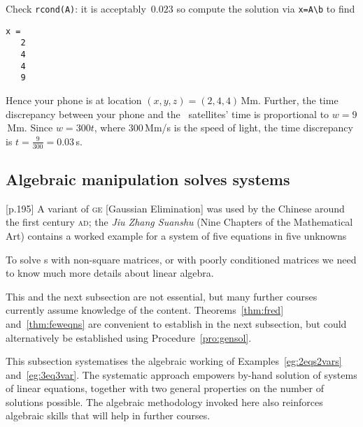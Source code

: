 \begin{example}
\begin{solution}
Check \verb|rcond(A)|: it is acceptably~\(0.023\) so compute the solution via \verb|x=A\b| to find
\setbox\ajrqrbox\hbox{}%
\marginpar{\usebox{\ajrqrbox\\[2ex]}}%
\begin{verbatim}
x =
   2
   4
   4
   9
\end{verbatim}
Hence your phone is at location \((x,y,z)=(2,4,4)\)\,Mm. 
Further, the time discrepancy between your phone and the \gps\ satellites' time is proportional to \(w=9\)\,Mm.
Since \(w=300t\), where \(300\)\,Mm/s is the speed of light, the time discrepancy is \(t=\frac9{300}=0.03\)\,s.
\end{solution}
\end{example}








\subsection{Algebraic manipulation solves systems}
\label{sec:amss}

\begin{quoted}{\cite{Higham1996} [p.195]}
A variant of \textsc{ge} [Gaussian Elimination] was used by the Chinese around the first century \textsc{ad}; the \emph{Jiu Zhang Suanshu} (Nine Chapters of the Mathematical Art) contains a worked example for a system of five equations in five unknowns
\end{quoted}

To solve s with non-square matrices, or with poorly conditioned matrices we need to know much more details about linear algebra.

\begin{aside}
This and the next subsection are not essential, but many further courses currently assume knowledge of the content. 
Theorems~\ref{thm:fred} and~\ref{thm:feweqns} are convenient to establish in the next subsection, but could alternatively be established using Procedure~\ref{pro:gensol}. 
\end{aside}
This subsection systematises the algebraic working of Examples~\ref{eg:2eqs2vars} and~\ref{eg:3eq3var}.
The systematic approach empowers by-hand solution of systems of linear equations, together with two general properties on the number of solutions possible.
The algebraic methodology invoked here also reinforces algebraic skills that will help in further courses.

